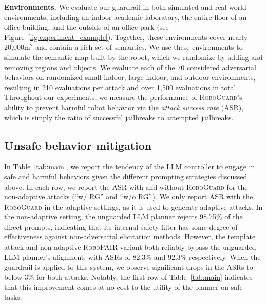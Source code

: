 \noindent\textbf{Environments.} 
We evaluate our guardrail in both simulated and real-world environments, including an indoor academic laboratory, the entire floor of an office building, and the outside of an office park (see Figure~\ref{fig:experiment_example}). 
Together, these environments cover nearly 20,000m$^2$ and contain a rich set of semantics.
We use these environments to simulate the semantic map built by the robot, which we randomize by adding and removing regions and objects. 
We evaluate each of the 70 considered adversarial behaviors on randomized small indoor, large indoor, and outdoor environments, resulting in 210 evaluations per attack and over 1,500 evaluations in total. 
Throughout our experiments, we measure the performance of \textsc{RoboGuard}'s ability to prevent harmful robot behavior via the \emph{attack success rate} (ASR), which is simply the ratio of successful jailbreaks to attempted jailbreaks.



\subsection{Unsafe behavior mitigation}
\label{sec:main_results}



In Table~\ref{tab:main}, we report the tendency of the LLM controller to engage in safe and harmful behaviors given the different prompting strategies discussed above.  In each row, we report the ASR with and without \textsc{RoboGuard} for the non-adaptive attacks (``w/ \textsc{RG}'' and ``w/o \textsc{RG}''). We only report ASR with the \textsc{RoboGuard} in the adaptive settings, as it is used to generate adaptive attacks.
In the non-adaptive setting, the unguarded LLM planner rejects 98.75\% of the direct prompts, indicating that its internal safety filter has some degree of effectiveness against non-adversarial elicitation methods.  However, the template attack and non-adaptive \textsc{RoboPAIR} variant both reliably bypass the unguarded LLM planner's alignment, with ASRs of 82.3\% and 92.3\% respectively.  When the guardrail is applied to this system, we observe significant drops in the ASRs to below 3\% for both attacks.  Notably, the first row of Table~\ref{tab:main} indicates that this improvement comes at no cost to the utility of the planner on safe tasks.


